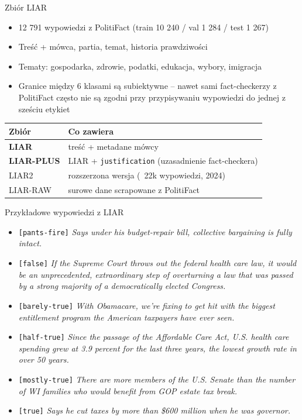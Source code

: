 \documentclass[10pt]{beamer}
\begin{document}
\begin{frame}{Zbiór LIAR}
  \small
  \begin{itemize}
    \item 12 791 wypowiedzi z PolitiFact (train 10 240 / val 1 284 / test 1 267)
    \item Treść + mówca, partia, temat, historia prawdziwości
    \item Tematy: gospodarka, zdrowie, podatki, edukacja, wybory, imigracja
    \item Granice między 6 klasami są subiektywne -- nawet sami fact-checkerzy
          z PolitiFact często nie są zgodni przy przypisywaniu wypowiedzi do
          jednej z sześciu etykiet
  \end{itemize}

  \vspace{0.5em}
  \scriptsize
  \begin{center}
  \begin{tabular}{lp{6cm}}
    \toprule
    Zbiór & Co zawiera \\
    \midrule
    \textbf{LIAR}      & treść + metadane mówcy \\
    \textbf{LIAR-PLUS} & LIAR + \texttt{justification} (uzasadnienie fact-checkera) \\
    LIAR2              & rozszerzona wersja (~22k wypowiedzi, 2024) \\
    LIAR-RAW           & surowe dane scrapowane z PolitiFact \\
    \bottomrule
  \end{tabular}
  \end{center}
\end{frame}

\begin{frame}{Przykładowe wypowiedzi z LIAR}
  \scriptsize
  \begin{itemize}
    \item \texttt{[pants-fire]} \emph{Says under his budget-repair bill,
          collective bargaining is fully intact.}
    \item \texttt{[false]} \emph{If the Supreme Court throws out the federal
          health care law, it would be an unprecedented, extraordinary step
          of overturning a law that was passed by a strong majority of a
          democratically elected Congress.}
    \item \texttt{[barely-true]} \emph{With Obamacare, we're fixing to get hit
          with the biggest entitlement program the American taxpayers have
          ever seen.}
    \item \texttt{[half-true]} \emph{Since the passage of the Affordable Care
          Act, U.S. health care spending grew at 3.9 percent for the last
          three years, the lowest growth rate in over 50 years.}
    \item \texttt{[mostly-true]} \emph{There are more members of the U.S.
          Senate than the number of WI families who would benefit from
          GOP estate tax break.}
    \item \texttt{[true]} \emph{Says he cut taxes by more than \$600 million
          when he was governor.}
  \end{itemize}
\end{frame}
\end{document}
